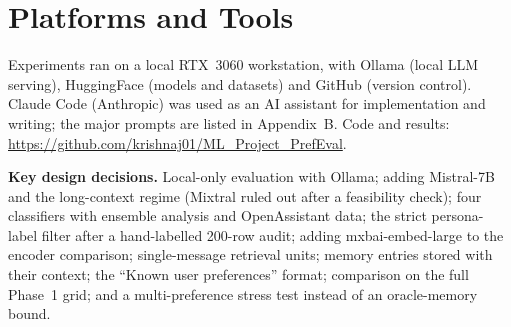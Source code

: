 \documentclass[lettersize,journal]{IEEEtran}
\begin{document}



\appendices
\section{Platforms and Tools}
Experiments ran on a local RTX~3060 workstation, with Ollama (local LLM serving), HuggingFace (models and datasets) and GitHub
(version control). Claude Code (Anthropic) was used as an AI assistant for implementation and writing; the major prompts are listed
in Appendix~B. Code and results: \url{https://github.com/krishnaj01/ML_Project_PrefEval}.

\textbf{Key design decisions.} Local-only evaluation with Ollama; adding Mistral-7B and the long-context regime (Mixtral ruled out after a
feasibility check); four classifiers with ensemble analysis and OpenAssistant data; the strict persona-label filter after a hand-labelled
200-row audit; adding mxbai-embed-large to the encoder comparison; single-message retrieval units; memory entries stored with their context;
the ``Known user preferences'' format; comparison on the full Phase~1 grid; and a multi-preference stress test instead of an oracle-memory bound.
\end{document}
